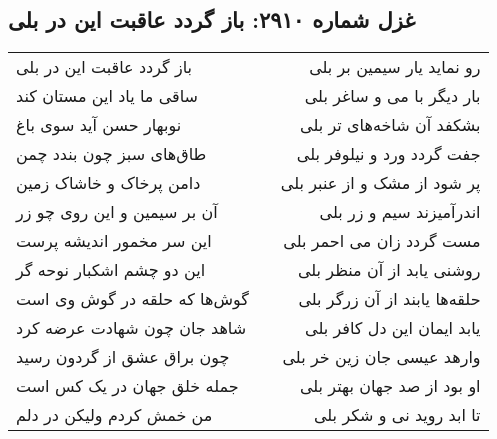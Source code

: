 \begin{center}
\section*{غزل شماره ۲۹۱۰: باز گردد عاقبت این در بلی}
\label{sec:2910}
\begin{longtable}{l p{0.5cm} r}
باز گردد عاقبت این در بلی
&&
رو نماید یار سیمین بر بلی
\\
ساقی ما یاد این مستان کند
&&
بار دیگر با می و ساغر بلی
\\
نوبهار حسن آید سوی باغ
&&
بشکفد آن شاخه‌های تر بلی
\\
طاق‌های سبز چون بندد چمن
&&
جفت گردد ورد و نیلوفر بلی
\\
دامن پرخاک و خاشاک زمین
&&
پر شود از مشک و از عنبر بلی
\\
آن بر سیمین و این روی چو زر
&&
اندرآمیزند سیم و زر بلی
\\
این سر مخمور اندیشه پرست
&&
مست گردد زان می احمر بلی
\\
این دو چشم اشکبار نوحه گر
&&
روشنی یابد از آن منظر بلی
\\
گوش‌ها که حلقه در گوش وی است
&&
حلقه‌ها یابند از آن زرگر بلی
\\
شاهد جان چون شهادت عرضه کرد
&&
یابد ایمان این دل کافر بلی
\\
چون براق عشق از گردون رسید
&&
وارهد عیسی جان زین خر بلی
\\
جمله خلق جهان در یک کس است
&&
او بود از صد جهان بهتر بلی
\\
من خمش کردم ولیکن در دلم
&&
تا ابد روید نی و شکر بلی
\\
\end{longtable}
\end{center}
